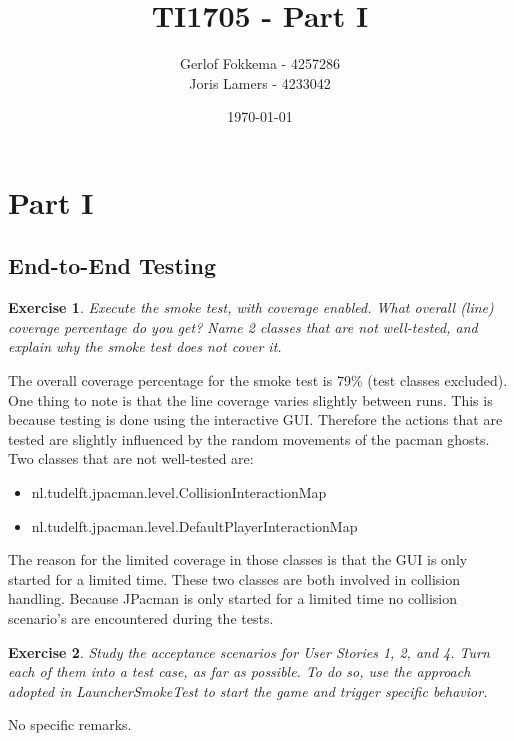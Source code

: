 \documentclass[a4paper]{article}
\title{TI1705 - Part I}
\author{Gerlof Fokkema - 4257286\\
		Joris Lamers - 4233042}
\date{\today}
\newtheorem{thm}{Exercise}
\begin{document}
  \maketitle
  \section{Part I}
  
  \subsection{End-to-End Testing}
    \begin{thm}
      Execute the smoke test, with coverage enabled. What overall (line) coverage percentage do you get? Name 2 classes that are not well-tested, and explain why the smoke test does not cover it.
    \end{thm}    
    The overall coverage percentage for the smoke test is 79\% (test classes excluded). \\
    One thing to note is that the line coverage varies slightly between runs. This is because testing is done using the interactive GUI. Therefore the actions that are tested are slightly influenced by the random movements of the pacman ghosts. \\
    Two classes that are not well-tested are:
    \begin{itemize}
      \item nl.tudelft.jpacman.level.CollisionInteractionMap
      \item nl.tudelft.jpacman.level.DefaultPlayerInteractionMap
    \end{itemize}
    The reason for the limited coverage in those classes is that the GUI is only started for a limited time. These two classes are both involved in collision handling. Because JPacman is only started for a limited time no collision scenario's are encountered during the tests.


    \begin{thm}
      Study the acceptance scenarios for User Stories 1, 2, and 4. Turn each of them into a test case, as far as possible. To do so, use the approach adopted in LauncherSmokeTest to start the game and trigger specific behavior.
    \end{thm}
    No specific remarks.
\end{document}
